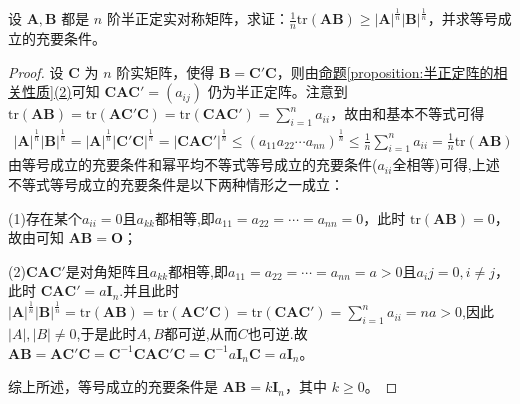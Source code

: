 \documentclass[../../main.tex]{subfiles}
\begin{document}
\begin{proposition}\label{proposition:半正定阵的迹与行列式相关不等式}
设 \(\boldsymbol{A},\boldsymbol{B}\) 都是 \(n\) 阶半正定实对称矩阵，求证：\(\frac{1}{n}\mathrm{tr}(\boldsymbol{A}\boldsymbol{B})\geq|\boldsymbol{A}|^{\frac{1}{n}}|\boldsymbol{B}|^{\frac{1}{n}}\)，并求等号成立的充要条件。
\end{proposition}
\begin{proof}
设 \(\boldsymbol{C}\) 为 \(n\) 阶实矩阵，使得 \(\boldsymbol{B}=\boldsymbol{C}'\boldsymbol{C}\)，则由\hyperref[proposition:半正定阵的相关性质]{命题\ref{proposition:半正定阵的相关性质}(2)}可知 \(\boldsymbol{C}\boldsymbol{A}\boldsymbol{C}'=(a_{ij})\) 仍为半正定阵。注意到 \(\mathrm{tr}(\boldsymbol{A}\boldsymbol{B})=\mathrm{tr}(\boldsymbol{A}\boldsymbol{C}'\boldsymbol{C})=\mathrm{tr}(\boldsymbol{C}\boldsymbol{A}\boldsymbol{C}')=\sum_{i = 1}^{n}a_{ii}\)，故由和基本不等式可得
\begin{align*}
|\boldsymbol{A}|^{\frac{1}{n}}|\boldsymbol{B}|^{\frac{1}{n}}=|\boldsymbol{A}|^{\frac{1}{n}}|\boldsymbol{C}'\boldsymbol{C}|^{\frac{1}{n}}=|\boldsymbol{C}\boldsymbol{A}\boldsymbol{C}'|^{\frac{1}{n}}\leq(a_{11}a_{22}\cdots a_{nn})^{\frac{1}{n}}\leq\frac{1}{n}\sum_{i = 1}^{n}a_{ii}=\frac{1}{n}\mathrm{tr}(\boldsymbol{A}\boldsymbol{B})
\end{align*}
由等号成立的充要条件和幂平均不等式等号成立的充要条件($a_{ii}$全相等)可得,上述不等式等号成立的充要条件是以下两种情形之一成立：

(1)存在某个$a_{ii}=0$且$a_{kk}$都相等,即\(a_{11}=a_{22}=\cdots=a_{nn}=0\)，此时 \(\mathrm{tr}(\boldsymbol{A}\boldsymbol{B}) = 0\)，故由可知 \(\boldsymbol{A}\boldsymbol{B}=\boldsymbol{O}\)；

(2)$\boldsymbol{C}\boldsymbol{A}\boldsymbol{C}'$是对角矩阵且$a_{kk}$都相等,即\(a_{11}=a_{22}=\cdots=a_{nn}=a>0\)且$a_ij=0,i\ne j$，此时
\(\boldsymbol{C}\boldsymbol{A}\boldsymbol{C}'=a\boldsymbol{I}_n\).并且此时\(|\boldsymbol{A}|^{\frac{1}{n}}|\boldsymbol{B}|^{\frac{1}{n}}=\mathrm{tr}(\boldsymbol{A}\boldsymbol{B})=\mathrm{tr}(\boldsymbol{A}\boldsymbol{C}'\boldsymbol{C})=\mathrm{tr}(\boldsymbol{C}\boldsymbol{A}\boldsymbol{C}')=\sum_{i = 1}^{n}a_{ii}=na>0\),因此$|A|,|B|\ne0$,于是此时$A,B$都可逆,从而$C$也可逆.故 \(\boldsymbol{AB}=\boldsymbol{AC}' \boldsymbol{C}=\boldsymbol{C}^{-1}\boldsymbol{CAC}' \boldsymbol{C}=\boldsymbol{C}^{-1}a\boldsymbol{I}_n\boldsymbol{C}=a\boldsymbol{I}_n\)。

综上所述，等号成立的充要条件是 \(\boldsymbol{A}\boldsymbol{B}=k\boldsymbol{I}_n\)，其中 \(k\geq0\)。
\end{proof}
\end{document}
